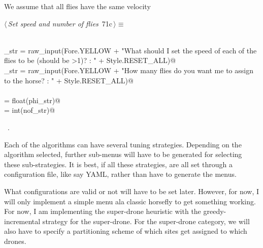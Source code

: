 \documentclass[11.5pt]{report}
\begin{document}
\vspace{-0.8cm} \newchunk We assume that all flies have the same velocity
\begin{flushleft} \small
\begin{minipage}{\linewidth}\label{scrap104}\raggedright\small
{} $\langle\,${\itshape Set speed and number of flies}\nobreak\ {\footnotesize {71c}}$\,\rangle\equiv$
\vspace{-1ex}
\begin{list}{}{} \item
\mbox{}\verb@@\\
\mbox{}\verb@phi_str = raw_input(Fore.YELLOW + "What should I set the speed of each of the flies to be (should be >1)? : " + Style.RESET_ALL)@\\
\mbox{}\verb@nof_str = raw_input(Fore.YELLOW + "How many flies do you want me to assign to the horse? : " + Style.RESET_ALL)@\\
\mbox{}\verb@@\\
\mbox{}\verb@phi = float(phi_str)@\\
\mbox{}\verb@nof = int(nof_str)@\\
\mbox{}\verb@@{\NWsep}
\end{list}
\vspace{-1.5ex}
\footnotesize
\begin{list}{}{\setlength{\itemsep}{-\parsep}\setlength{\itemindent}{-\leftmargin}}
\item \NWtxtMacroRefIn\ .

\item{}
\end{list}
\end{minipage}\vspace{4ex}
\end{flushleft}



\vspace{-0.8cm} \newchunk Each of the algorithms can have several tuning strategies. 
Depending on the algorithm selected, further sub-menus will have to be generated for 
selecting these sub-strategies. It is best, if all these strategies, are all set 
through a configuration file, like say YAML, rather than have to generate the menus. 

What configurations are valid or not will have to be set later. However, for now, I 
will only implement a simple menu ala classic horsefly to get something working. 
For now, I am implementing the super-drone heuristic with the greedy-incremental 
strategy for the super-drone. For the super-drone category, we will also have 
to specify a partitioning scheme of which sites get assigned to which drones. 
\end{document}
